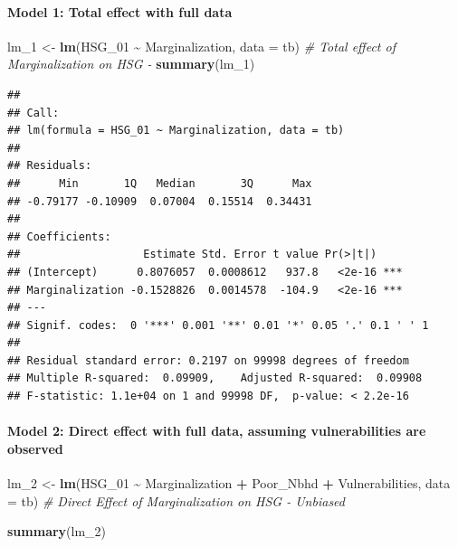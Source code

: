 \documentclass[
]{article}
\newenvironment{Shaded}{\begin{snugshade}}{\end{snugshade}}
\newcommand{\AttributeTok}[1]{\textcolor[rgb]{0.13,0.29,0.53}{#1}}
\newcommand{\CommentTok}[1]{\textcolor[rgb]{0.56,0.35,0.01}{\textit{#1}}}
\newcommand{\FunctionTok}[1]{\textcolor[rgb]{0.13,0.29,0.53}{\textbf{#1}}}
\newcommand{\NormalTok}[1]{#1}
\newcommand{\OtherTok}[1]{\textcolor[rgb]{0.56,0.35,0.01}{#1}}
\newcommand{\SpecialCharTok}[1]{\textcolor[rgb]{0.81,0.36,0.00}{\textbf{#1}}}
\begin{document}
\paragraph{Model 1: Total effect with full
data}\label{model-1-total-effect-with-full-data}

\begin{Shaded}
\begin{Highlighting}[]
\NormalTok{lm\_1 }\OtherTok{\textless{}{-}} \FunctionTok{lm}\NormalTok{(HSG\_01 }\SpecialCharTok{\textasciitilde{}}\NormalTok{ Marginalization, }\AttributeTok{data =}\NormalTok{ tb) }\CommentTok{\# Total effect of Marginalization on HSG {-} }
\FunctionTok{summary}\NormalTok{(lm\_1)}
\end{Highlighting}
\end{Shaded}

\begin{verbatim}
## 
## Call:
## lm(formula = HSG_01 ~ Marginalization, data = tb)
## 
## Residuals:
##      Min       1Q   Median       3Q      Max 
## -0.79177 -0.10909  0.07004  0.15514  0.34431 
## 
## Coefficients:
##                   Estimate Std. Error t value Pr(>|t|)    
## (Intercept)      0.8076057  0.0008612   937.8   <2e-16 ***
## Marginalization -0.1528826  0.0014578  -104.9   <2e-16 ***
## ---
## Signif. codes:  0 '***' 0.001 '**' 0.01 '*' 0.05 '.' 0.1 ' ' 1
## 
## Residual standard error: 0.2197 on 99998 degrees of freedom
## Multiple R-squared:  0.09909,    Adjusted R-squared:  0.09908 
## F-statistic: 1.1e+04 on 1 and 99998 DF,  p-value: < 2.2e-16
\end{verbatim}

\paragraph{Model 2: Direct effect with full data, assuming
vulnerabilities are
observed}\label{model-2-direct-effect-with-full-data-assuming-vulnerabilities-are-observed}

\begin{Shaded}
\begin{Highlighting}[]
\NormalTok{lm\_2 }\OtherTok{\textless{}{-}} \FunctionTok{lm}\NormalTok{(HSG\_01 }\SpecialCharTok{\textasciitilde{}}\NormalTok{ Marginalization }\SpecialCharTok{+}\NormalTok{ Poor\_Nbhd }\SpecialCharTok{+}\NormalTok{ Vulnerabilities, }\AttributeTok{data =}\NormalTok{ tb)   }\CommentTok{\# Direct Effect of Marginalization on HSG {-} Unbiased}

\FunctionTok{summary}\NormalTok{(lm\_2)}
\end{Highlighting}
\end{Shaded}
\end{document}
